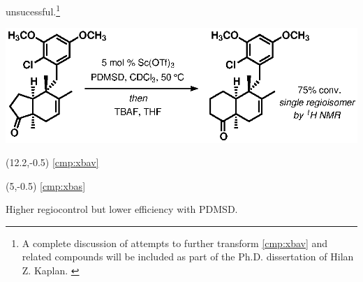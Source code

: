 unsucessful.\footnote{A complete discussion of attempts to further transform \ref{cmp:xbav} and
related compounds will be included as part of the Ph.D. dissertation of Hilan Z. Kaplan.
\label{ref:kaplancopout}} \begin{Scheme}[h]
  \centering
  \includegraphics[scale=0.8]{chp_singlecarbon/images/homoonepdms}
    \begin{textblock}{1}(12.2,-0.5) \textsf{\scriptsize{\ref{cmp:xbav}}} \end{textblock}
    \begin{textblock}{1}(5,-0.5) \textsf{\scriptsize{\ref{cmp:xbas}}}
\end{textblock}
  \caption{Higher regiocontrol but lower efficiency with PDMSD.}
  \label{sch:homoonepdms}
\end{Scheme}


